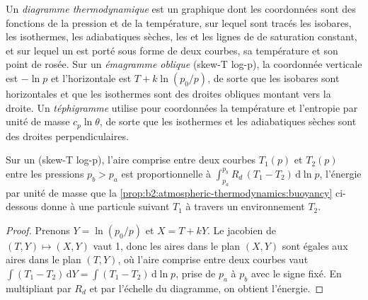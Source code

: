 \begin{definition}\label{def:b2:atmospheric-thermodynamics:diagram}
Un \emph{diagramme thermodynamique} est un graphique dont les coordonnées
sont des fonctions de la pression et de la température, sur lequel sont tracés les isobares, les
isothermes, les adiabatiques sèches, les  et les lignes de  de
saturation constant, et sur lequel un  est porté sous forme de deux courbes, sa température
et son point de rosée. Sur un \emph{émagramme oblique} (skew-T log-p), la
coordonnée verticale est $-\ln p$ et l'horizontale est $T + k\ln(p_0/p)$, de sorte que les isobares sont
horizontales et que les isothermes sont des droites obliques montant vers la droite. Un
\emph{téphigramme} utilise pour coordonnées la température et l'entropie par unité de masse
$c_p\ln\theta$, de sorte que les isothermes et les adiabatiques sèches sont des droites perpendiculaires.
\end{definition}

\begin{proposition}\label{prop:b2:atmospheric-thermodynamics:areas}
Sur un  (skew-T log-p), l'aire comprise entre deux courbes $T_1(p)$ et $T_2(p)$
entre les pressions $p_b > p_a$ est proportionnelle à $\int_{p_a}^{p_b} R_d\,(T_1 - T_2)\,\mathrm{d}\ln p$,
l'énergie par unité de masse que la \cref{prop:b2:atmospheric-thermodynamics:buoyancy}
ci-dessous donne à une particule suivant $T_1$ à travers un environnement $T_2$.
\end{proposition}

\begin{proof}
Prenons $Y = \ln(p_0/p)$ et $X = T + kY$. Le jacobien de $(T, Y) \mapsto (X, Y)$ vaut 1, donc les aires
dans le plan $(X, Y)$ sont égales aux aires dans le plan $(T, Y)$, où l'aire comprise entre deux
courbes vaut $\int (T_1 - T_2)\,\mathrm{d}Y = \int (T_1 - T_2)\,\mathrm{d}\ln p$, prise de $p_a$ à $p_b$
avec le signe fixé. En multipliant par $R_d$ et par l'échelle du diagramme, on obtient l'énergie.
\end{proof}

